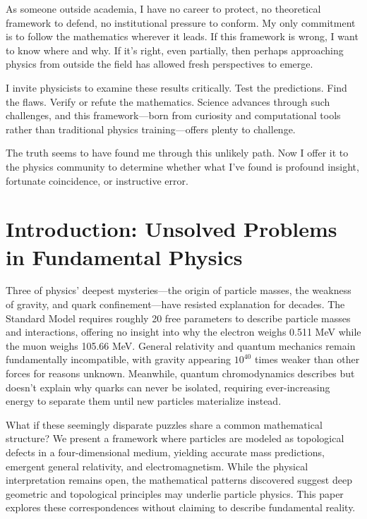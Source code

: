 As someone outside academia, I have no career to protect, no theoretical framework to defend, no institutional pressure to conform. My only commitment is to follow the mathematics wherever it leads. If this framework is wrong, I want to know where and why. If it's right, even partially, then perhaps approaching physics from outside the field has allowed fresh perspectives to emerge.

I invite physicists to examine these results critically. Test the predictions. Find the flaws. Verify or refute the mathematics. Science advances through such challenges, and this framework---born from curiosity and computational tools rather than traditional physics training---offers plenty to challenge.

The truth seems to have found me through this unlikely path. Now I offer it to the physics community to determine whether what I've found is profound insight, fortunate coincidence, or instructive error.

\section{Introduction: Unsolved Problems in Fundamental Physics}

Three of physics' deepest mysteries---the origin of particle masses, the weakness of gravity, and quark confinement---have resisted explanation for decades. The Standard Model requires roughly 20 free parameters to describe particle masses and interactions, offering no insight into why the electron weighs 0.511 MeV while the muon weighs 105.66 MeV. General relativity and quantum mechanics remain fundamentally incompatible, with gravity appearing $10^{40}$ times weaker than other forces for reasons unknown. Meanwhile, quantum chromodynamics describes but doesn't explain why quarks can never be isolated, requiring ever-increasing energy to separate them until new particles materialize instead.

What if these seemingly disparate puzzles share a common mathematical structure? We present a framework where particles are modeled as topological defects in a four-dimensional medium, yielding accurate mass predictions, emergent general relativity, and electromagnetism. While the physical interpretation remains open, the mathematical patterns discovered suggest deep geometric and topological principles may underlie particle physics. This paper explores these correspondences without claiming to describe fundamental reality.


